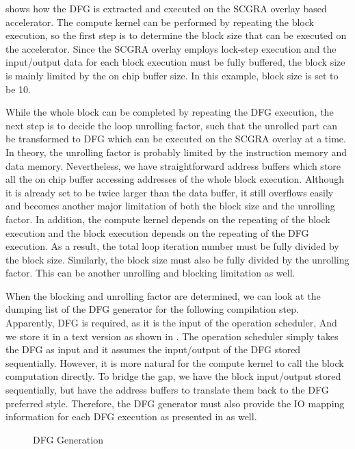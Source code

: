  shows how the DFG is extracted and executed on the SCGRA overlay based accelerator. The compute kernel can be performed by repeating the block execution, so the first step is to determine the block size that can be executed on the accelerator. Since the SCGRA overlay employs lock-step execution and the input/output data for each block execution must be fully buffered, the block size is mainly limited by the on chip buffer size. In this example, block size is set to be 10. 

While the whole block can be completed by repeating the DFG execution, the next step is to decide the loop unrolling factor, such that the unrolled part can be transformed to DFG which can be executed on the SCGRA overlay at a time. In theory, the unrolling factor is probably limited by the instruction memory and data memory. Nevertheless, we have straightforward address buffers which store all the on chip buffer accessing addresses of the whole block execution. Although it is already set to be twice larger than the data buffer, it still overflows easily and becomes another major limitation of both the block size and the unrolling factor. In addition, the compute kernel depends on the repeating of the block execution and the block execution depends on the repeating of the DFG execution. As a result, the total loop iteration number must be fully divided by the block size. Similarly, the block size must also be fully divided by the unrolling factor. This can be another unrolling and blocking limitation as well. 

When the blocking and unrolling factor are determined, we can look at the dumping list of the DFG generator for the following compilation step. Apparently, DFG is required, as it is the input of the operation scheduler, And we store it in a text version as shown in . The operation scheduler simply takes the DFG as input and it assumes the input/output of the DFG stored sequentially. However, it is more natural for the compute kernel to call the block computation directly. To bridge the gap, we have the block input/output stored sequentially, but have the address buffers to translate them back to the DFG preferred style. Therefore, the DFG generator must also provide the IO mapping information for each DFG execution as presented in  as well. 

\begin{figure}[H]
\caption{DFG Generation}
\label{fig:dfg-gen}
\end{figure}
       
